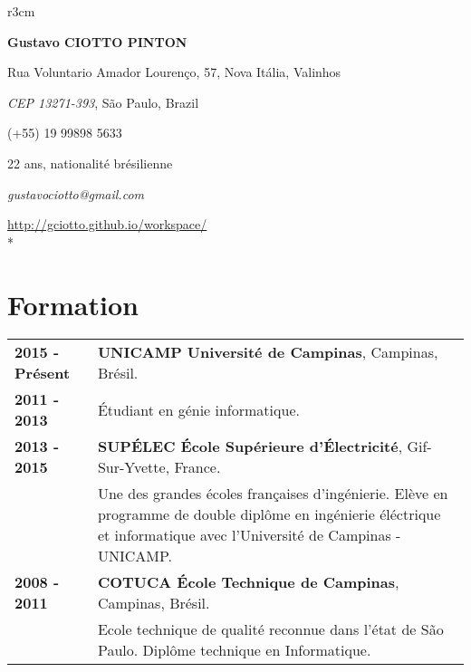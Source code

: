 \documentclass[10pt, a4paper]{article}
\author{Gustavo Ciotto Pinton}
\begin{document}
\pagestyle{empty} 

\begin{wrapfigure}{r}{3cm}
  \vspace{-20pt}
  \begin{center}
  \end{center}
\end{wrapfigure}

\textbf{\LARGE Gustavo CIOTTO PINTON}

Rua Voluntario Amador Lourenço, 57, Nova Itália, Valinhos

\textit{CEP 13271-393}, São Paulo, Brazil

(+55) 19 99898 5633

22 ans, nationalité brésilienne

\textit{gustavociotto@gmail.com} 

\url{http://gciotto.github.io/workspace/}\\*



\section{Formation}

\begin{tabular}{p{} p{}}

 \textbf{2015 - Présent} & \textbf{UNICAMP Université de Campinas}, Campinas,
 Brésil.
 \\
 \textbf{2011 - 2013} & Étudiant en génie informatique. \vspace{8pt}\\

 \textbf{2013 - 2015} & \textbf{SUPÉLEC  École Supérieure d'Électricité},
 Gif-Sur-Yvette, France. \\
 & Une des grandes écoles françaises d'ingénierie. Elève en programme de double
 diplôme en ingénierie éléctrique et informatique avec l'Université de Campinas
 - UNICAMP. \vspace{8pt}
 \\
  
 
 \textbf{2008 - 2011} & \textbf{COTUCA École Technique de Campinas}, Campinas, Brésil. \\ 
 & Ecole technique de qualité reconnue dans l’état de São Paulo. Diplôme
 technique en Informatique. \\
\end{tabular}
\end{document}
